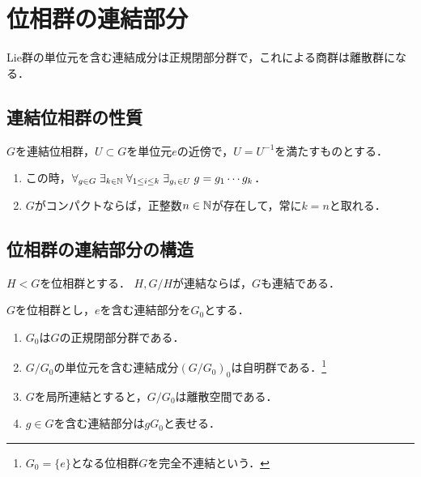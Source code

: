 \documentclass[uplatex,dvipdfmx]{jsreport}
\begin{document}
\section{位相群の連結部分}

\begin{tcolorbox}[colframe=ForestGreen, colback=ForestGreen!10!white,breakable,colbacktitle=ForestGreen!40!white,coltitle=black,fonttitle=\bfseries\sffamily,
title=]
    Lie群の単位元を含む連結成分は正規閉部分群で，これによる商群は離散群になる．
\end{tcolorbox}

\subsection{連結位相群の性質}

\begin{theorem}
    $G$を連結位相群，$U\subset G$を単位元$e$の近傍で，$U=U^{-1}$を満たすものとする．
    \begin{enumerate}
        \item この時，$\forall_{g\in G}\;\exists_{k\in\mathbb{N}}\;\forall_{1\le i\le k}\;\exists_{g_i\in U}\;g=g_1\cdots g_k$．
        \item $G$がコンパクトならば，正整数$n\in\mathbb{N}$が存在して，常に$k=n$と取れる．
    \end{enumerate}
\end{theorem}

\subsection{位相群の連結部分の構造}

\begin{lemma}
    $H<G$を位相群とする．
    $H,G/H$が連結ならば，$G$も連結である．
\end{lemma}

\begin{theorem}
    $G$を位相群とし，$e$を含む連結部分を$G_0$とする．
    \begin{enumerate}
        \item $G_0$は$G$の正規閉部分群である．
        \item $G/G_0$の単位元を含む連結成分$(G/G_0)_0$は自明群である．\footnote{$G_0=\{e\}$となる位相群$G$を完全不連結という．}
        \item $G$を局所連結とすると，$G/G_0$は離散空間である．
        \item $g\in G$を含む連結部分は$gG_0$と表せる．
    \end{enumerate}
\end{theorem}
\end{document}
